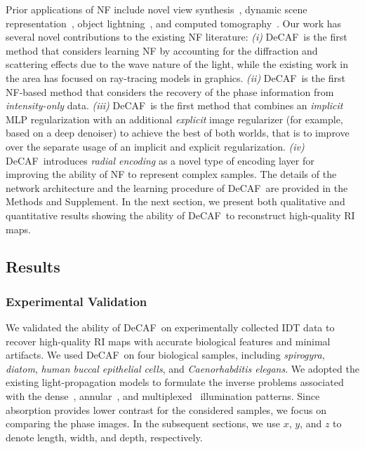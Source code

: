 \documentclass[11pt]{article}
\theoremstyle{plain} %
\def\proposed{DeCAF}
\begin{document}
Prior applications of NF include novel view synthesis~\cite{Mildenhall.etal2020,Martin.etal2020,Yu.etal2020}, dynamic scene representation~\cite{Park.etal2020,Peng.etal2021,Li.etal2021}, object lightning~\cite{Srinivasan.etal2020,Wizadwongsa.etal2021}, and computed tomography~\cite{Reed.etal2021}. 
Our work has several novel contributions to the existing NF literature: \emph{(i)} \proposed~is the first method that considers learning NF by accounting for the diffraction and scattering effects due to the wave nature of the light, while the existing work in the area has focused on ray-tracing models in graphics. \emph{(ii)} \proposed~is the first NF-based method that considers the recovery of the phase information from \emph{intensity-only} data.  \emph{(iii)} \proposed~is the first method that combines an \emph{implicit} MLP regularization with an additional \emph{explicit} image regularizer (for example, based on a deep denoiser) to achieve the best of both worlds, that is to improve over the separate usage of an implicit and explicit regularization. \emph{(iv)} \proposed~introduces \emph{radial encoding} as a novel type of encoding layer for improving the ability of NF to represent complex samples. The details of the network architecture and the learning procedure of \proposed~are provided in the Methods and Supplement. 
In the next section, we present both qualitative and quantitative results showing the ability of \proposed~to reconstruct high-quality RI maps.

\subsection*{Results}
\label{Sec:Results}

\subsubsection*{Experimental Validation}

We validated the ability of \proposed~on experimentally collected IDT data  to recover high-quality RI maps with accurate biological features and minimal artifacts. We used \proposed~on four biological samples, including \emph{spirogyra}, \emph{diatom}, \emph{human buccal epithelial cells}, and \emph{Caenorhabditis elegans}. We adopted the existing light-propagation models to formulate the inverse problems associated with the dense~\cite{Ling.etal18}, annular~\cite{LiJ.etal2019}, and multiplexed~\cite{Matlock.etal2019} illumination patterns. 
Since absorption provides lower contrast for the considered samples, we focus on comparing the phase images.
In the subsequent sections, we use $x$, $y$, and $z$ to denote length, width, and depth, respectively.
\end{document}
